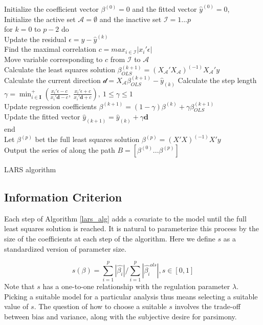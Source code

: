 \documentclass[titlepage,11pt]{article}
\begin{document}
\begin{algorithm}[!htbp]
	Initialize the coefficient vector $\beta^{(0)}=0$  and the fitted vector $\hat{y}^{(0)}=0$,\\
	Initialize the active set $\mathcal{A}=\emptyset$ and the inactive set $\mathcal{I}={1...p}$\\
	for $k=0$ to $p-2$ do\\
	Update the residual $\epsilon = y-\hat{y}^{(k)}$\\
	Find the maximal correlation $c = max_{i\in \mathcal{I}}|x_i'\epsilon|$\\
	Move variable corresponding to $c$ from $\mathcal{I}$ to $\mathcal{A}$\\
	Calculate the least squares solution $\beta^{(k+1)}_{OLS}= (X_\mathcal{A}'X_\mathcal{A})^{(-1)}X_\mathcal{A}'y$\\
	Calculate the current direction $\mathcal{d}=X_\mathcal{A}\beta^{(k+1)}_{OLS}-\hat{y}_{(k)}$
	Calculate the step length $\gamma = \min^{+}_{i\in \mathbf{I}}\left(\frac{x_i' \epsilon -c}{x_i' \mathbf{d} -c}, \: \frac{x_i' \epsilon + c}{x_i' \mathbf{d} + c}  \right),  \: 1\leq \gamma \leq 1$\\
	Update regression coefficients $\beta^{(k+1)} = (1-\gamma)\beta^{(k)} + \gamma\beta^{(k+1)}_{OLS}$\\
	Update the fitted vector $\hat{y}_{(k+1)} = \hat{y}_{(k)} + \gamma \mathbf{d}$\\
	end \\
	Let $\beta^{(p)}$ bet the full least squares solution $\beta^{(p)} = (X'X)^{(-1)}X'y$\\
	Output the series of along the path $B = [\beta^{(0)}...\beta^{(p)}]$	
	\caption{LARS algorithm}
	\label{lars_alg}
\end{algorithm}



\subsection{Information Criterion}

Each step of Algorithm \ref{lars_alg} adds a covariate to the model until the full least squares solution is reached. It is natural to parameterize this process by the size of the coefficients at each step of the algorithm. Here we define $s$ as a standardized version of parameter size.

\begin{equation}
\label{s}
s(\beta)=\sum_{i=1}^{p}|\hat{\beta_i}|/\sum_{i=1}^{p}|\hat{\beta_i}^{ols}|, s\in [0,1]
\end{equation}
Note that $s$ has a one-to-one relationship with the regulation parameter $\lambda$. Picking a suitable model for a particular analysis thus means selecting a suitable value of $s$. The question of how to choose a suitable $s$ involves the trade-off between bias and variance, along with the subjective desire for parsimony. 
\end{document}
